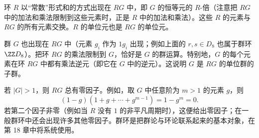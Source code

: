 环 $R$ 以“常数”形式和的方式出现在 $RG$ 中，即 $G$ 的恒等元的 $R$-倍（注意把 $RG$ 中的加法和乘法限制到这些元素时，正是 $R$ 中的加法和乘法）。这些 $R$ 的元素与 $RG$ 的所有元素交换。$R$ 的单位元也是 $RG$ 的单位元。

群 $G$ 也出现在 $RG$ 中（元素 $g_i$ 作为 $1g_i$ 出现；例如上面的 $r,s\in D_8$ 也属于群环 $\ZZ D_8$）。把环 $RG$ 的乘法限制到 $G$，恰好是 $G$ 的群运算。特别地，$G$ 的每个元素在环 $RG$ 中都有乘法逆元（即它在 $G$ 中的逆元）。这说明 $G$ 是 $RG$ 的单位群的子群。

若 $|G|>1$，则 $RG$ 总有零因子。例如，取 $G$ 中任意阶为 $m>1$ 的元素 $g$，则
\[
  (1-g)(1+g+\cdots+g^{m-1})=1-g^m=0.
\]
若第二个因子非零（例如当 $R$ 没有 $1$ 的非平凡周期时），这便给出零因子；在一般群环中还会出现许多其他零因子。群环是把群论与环论联系起来的基本对象，在第 18 章中将系统使用。

